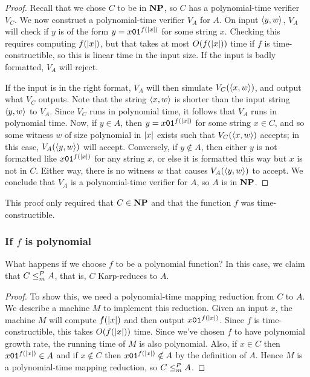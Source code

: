 \begin{proof}
  Recall that we chose $C$ to be in $\textbf{NP}$, so $C$ has a polynomial-time verifier $V_C$. We now construct a polynomial-time verifier $V_A$ for $A$. On input $\left< y, w \right>$, $V_A$ will check if $y$ is of the form $y = x\texttt{0}\texttt{1}^{f(| x |)}$ for some string $x$. Checking this requires computing $f(| x |)$, but that takes at most $O(f(| x |))$ time if $f$ is time-constructible, so this is linear time in the input size. If the input is badly formatted, $V_A$ will reject.

  If the input is in the right format, $V_A$ will then simulate $V_C(\left< x, w \right>)$, and output what $V_C$ outputs. Note that the string $\left< x, w \right>$ is shorter than the input string $\left< y, w \right>$ to $V_A$. Since $V_C$ runs in polynomial time, it follows that $V_A$ runs in polynomial time. Now, if $y \in A$, then $y = x\texttt{0}\texttt{1}^{f(| x |)}$ for some string $x \in C$, and so some witness $w$ of size polynomial in $| x |$ exists such that $V_C(\left< x, w \right>)$ accepts; in this case, $V_A(\left< y, w \right>)$ will accept. Conversely, if $y \notin A$, then either $y$ is not formatted like $x\texttt{0}\texttt{1}^{f(| x |)}$ for any string $x$, or else it is formatted this way but $x$ is not in $C$. Either way, there is no witness $w$ that causes $V_A(\left< y, w \right>)$ to accept. We conclude that $V_A$ is a polynomial-time verifier for $A$, so $A$ is in $\textbf{NP}$.
\end{proof}

This proof only required that $C \in \textbf{NP}$ and that the function $f$ was time-constructible.

\subsubsection{If $f$ is polynomial}
What happens if we choose $f$ to be a polynomial function? In this case, we claim that $C \leq_m^P A$, that is, $C$ Karp-reduces to $A$.

\begin{proof}
  To show this, we need a polynomial-time mapping reduction from $C$ to $A$. We describe a machine $M$ to implement this reduction. Given an input $x$, the machine $M$ will compute $f(| x |)$ and then output $x\texttt{0}\texttt{1}^{f(| x |)}$. Since $f$ is time-constructible, this takes $O(f(| x |))$ time. Since we've chosen $f$ to have polynomial growth rate, the running time of $M$ is also polynomial. Also, if $x \in C$ then $x\texttt{0}\texttt{1}^{f(| x |)} \in A$ and if $x \notin C$ then $x\texttt{0}\texttt{1}^{f(| x |)} \notin A$ by the definition of $A$. Hence $M$ is a polynomial-time mapping reduction, so $C \leq_m^P A$.
\end{proof}


